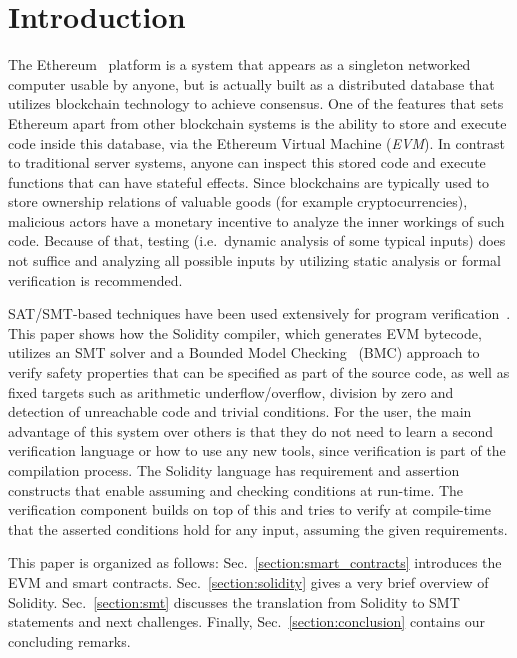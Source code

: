 \section{Introduction}
The Ethereum~\cite{WhitePaper} platform is a system that appears as a
singleton networked computer usable by anyone, but is actually built as a
distributed database that utilizes blockchain technology to achieve consensus.
%
One of the features that sets Ethereum apart from other blockchain systems is
the ability to store and execute code inside this database, via the Ethereum
Virtual Machine (\emph{EVM}).
%
In contrast to traditional server systems, anyone can inspect this stored code
and execute functions that can have stateful effects.
%
Since blockchains are typically used to store ownership relations of valuable goods
(for example
cryptocurrencies),
malicious actors have a monetary incentive to analyze the inner
workings of such code. Because of that, testing (i.e.\  dynamic analysis of some
typical inputs) does not suffice and analyzing all possible inputs by utilizing
static analysis or formal verification is recommended.

SAT/SMT-based techniques have been used extensively for program 
verification~\cite{Biere99,Donaldson11,Komuravelli13,Beyer11,Kroening14,Alt17}.
%
This paper shows how the Solidity compiler, which generates EVM bytecode,
utilizes an SMT solver and a Bounded Model Checking~\cite{Biere99} (BMC) approach to
verify safety properties that can be specified as part of the source code, as
well as fixed targets such as arithmetic underflow/overflow, division by zero and detection of
unreachable code and trivial conditions.
%
For the user, the main advantage of this system over others is that they do not
need to learn a second verification language or how to use any new tools, since
verification is part of the compilation process.
%
The Solidity language has requirement and assertion constructs that enable
assuming and checking conditions at run-time.  The verification component
builds on top of this and tries to
verify at compile-time that the asserted conditions hold for any input,
assuming the given requirements.

This paper is organized as follows:  Sec.~\ref{section:smart_contracts}
introduces the EVM and smart contracts.  Sec.~\ref{section:solidity} gives a
very brief overview of Solidity. Sec.~\ref{section:smt} discusses the
translation from Solidity to SMT statements and next challenges. Finally,
Sec.~\ref{section:conclusion} contains our concluding remarks.

